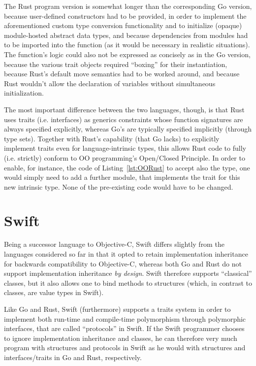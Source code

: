 \documentclass[11pt,oneside]{report}
\newcommand{\code}[1]{{\selectfont\ttfamily{#1}}}
\begin{document}


The Rust program version is somewhat longer than the corresponding Go
version, because user-defined constructors had to be provided, in
order to implement the aforementioned custom type conversion
functionality and to initialize (opaque) module-hosted abstract data
types, and because dependencies from modules had to be imported into
the \code{main} function (as it would be necessary in realistic
situations). The \code{main} function's logic could also not be
expressed as concisely as in the Go version, because the various trait
objects required ``boxing'' for their instantiation, because Rust's
default move semantics had to be worked around, and because Rust
wouldn't allow the declaration of variables without simultaneous
initialization.

The most important difference between the two languages, though, is
that Rust uses traits (i.e. interfaces) as generics constraints whose
function signatures are always specified explicitly, whereas Go's are
typically specified implicitly (through type sets). Together with
Rust's capability (that Go lacks) to explicitly implement traits even
for language-intrinsic types, this allows Rust code to fully
(i.e. strictly) conform to OO programming's Open/Closed Principle. In
order to enable, for instance, the code of Listing~\ref{lst:OORust} to
accept also the \code{f32} type, one would simply need to add a
further module, that implements the \code{INumeric} trait for this new
intrinsic type. None of the pre-existing code would have to be
changed.


\section{Swift}
\label{sect:Swift}

Being a successor language to Objective-C, Swift differs slightly from
the languages considered so far in that it opted to retain
implementation inheritance for backwards compatibility to Objective-C,
whereas both Go and Rust do not support implementation inheritance
\emph{by design}. Swift therefore supports ``classical'' classes, but
it also allows one to bind methods to structures (which, in contrast
to classes, are value types in Swift).

Like Go and Rust, Swift (furthermore) supports a traits system in order
to implement both run-time and compile-time polymorphism through
polymorphic interfaces, that are called ``protocols'' in Swift. If the
Swift programmer chooses to ignore implementation inheritance and
classes, he can therefore very much program with structures and
protocols in Swift as he would with structures and interfaces/traits
in Go and Rust, respectively.
\end{document}
